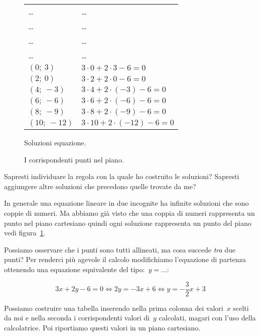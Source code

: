 \begin{inaccessibleblock}
 \begin{figure}[h]
 \centering
 \begin{minipage}[]{.50\textwidth}
\begin{tabular}{ll}
\dots & \dots \\
\dots & \dots \\
\dots & \dots \\
\dots & \dots \\
\((0; ~3)\)   & \(3 \cdot 0 + 2 \cdot 3 - 6 = 0\)     \\
\((2; ~0)\)   & \(3 \cdot 2 + 2 \cdot 0 - 6 = 0\)     \\
\((4;~-3)\)   & \(3 \cdot 4 + 2 \cdot (-3) - 6 = 0\)  \\
\((6;~-6)\)   & \(3 \cdot 6 + 2 \cdot (-6) - 6 = 0\)  \\
\((8;~-9)\)   & \(3 \cdot 8 + 2 \cdot (-9) - 6 = 0\)  \\
\((10;~-12)\) & \(3 \cdot 10 + 2 \cdot (-12) - 6 = 0\)
\end{tabular}
  \caption{Soluzioni equazione.}\label{fig:soluzioniequazione}
 \end{minipage}
 \begin{minipage}[]{.40\textwidth}
  \centering
  \caption{I corrispondenti punti nel piano.}\label{fig:puntiallineati}
 \end{minipage}
\end{figure}
\end{inaccessibleblock}


Sapresti individuare la regola con la quale ho costruito le soluzioni? 
Sapresti aggiungere altre soluzioni che precedono quelle trovate da me?

In generale una equazione lineare in due incognite ha infinite soluzioni che 
sono coppie di numeri. Ma abbiamo già visto che una coppia di numeri 
rappresenta un punto nel piano cartesiano quindi ogni soluzione rappresenta 
un punto del piano vedi figura~\ref{fig:puntiallineati}.

Possiamo osservare che i punti sono tutti allineati, ma cosa succede 
\emph{tra} due punti? Per renderci più agevole il calcolo modifichiamo
l'equazione di partenza ottenendo una equazione equivalente del 
tipo:~\(y = \dots\):

\[3x + 2y - 6 = 0 \Leftrightarrow 2y = -3x +6 \Leftrightarrow 
 y = -\frac{3}{2}x +3\]

Possiamo costruire una tabella inserendo nella prima colonna dei valori~\(x\) 
scelti da noi e nella seconda i corrispondenti valori di~\(y\) calcolati, 
magari con l'uso della calcolatrice. Poi riportiamo questi valori in un 
piano cartesiano.

